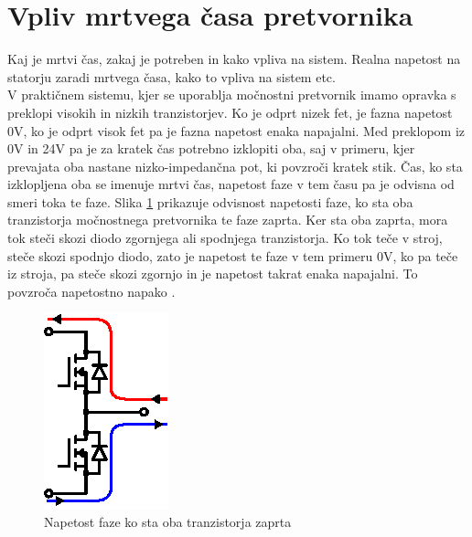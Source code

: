 \documentclass[a4paper,twoside,openright,12pt,slovene]{book}
\begin{document}
\section{Vpliv mrtvega časa pretvornika}
Kaj je mrtvi čas, zakaj je potreben in kako vpliva na sistem. Realna napetost na statorju zaradi mrtvega časa, kako to vpliva na sistem etc. 
\\
V praktičnem sistemu, kjer se uporablja močnostni pretvornik imamo opravka s preklopi visokih in nizkih tranzistorjev. Ko je odprt nizek fet, je fazna napetost 0V, ko je odprt visok fet pa je fazna
napetost enaka napajalni. Med preklopom iz 0V in 24V pa je za kratek čas potrebno izklopiti oba, saj v primeru, kjer prevajata oba nastane nizko-impedančna pot, ki povzroči kratek stik. Čas, ko sta
izklopljena oba se imenuje mrtvi čas, napetost faze v tem času pa je odvisna od smeri toka te faze. Slika \ref{mrtviCasRazlaga} prikazuje odvisnost napetosti faze, ko sta oba tranzistorja močnostnega
pretvornika te faze zaprta. Ker sta oba zaprta, mora tok steči skozi diodo zgornjega ali spodnjega tranzistorja. Ko tok teče v stroj, steče skozi spodnjo diodo, zato je napetost te faze v tem primeru
0V, ko pa teče iz stroja, pa steče skozi zgornjo in je napetost takrat enaka napajalni. To povzroča napetostno napako \cite{ambrovzivc2016elektrivcni}.

\begin{figure}[!htbp]
    \centering
    \includegraphics[width=0.5\columnwidth]{Slike/Inkscape/mrtviCasRazlaga.eps}
    \caption{\label{mrtviCasRazlaga} Napetost faze ko sta oba tranzistorja zaprta}
\end{figure}
\end{document}
